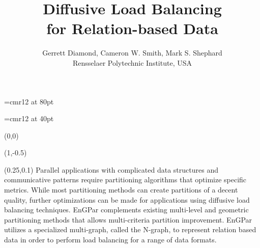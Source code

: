 \documentclass{beamer}
\begin{document}
\font\titlefont=cmr12 at 80pt
\title[]
{\titlefont
Diffusive Load Balancing \\for Relation-based Data
}
\font\authorfont=cmr12 at 40pt
\author[]{\authorfont
  Gerrett Diamond, Cameron W. Smith, Mark S. Shephard\\
  Rensselaer Polytechnic Institute, USA}
\date{}
\begin{textblock}{15.8}(0,0)
  \titlepage
  \begin{textblock}{14}(1,-0.5)
    \begin{block}{}
      \begin{textblock}{13.5}(0.25,0.1)
        \centering
        \justify
          \fontsize{37}{43}\selectfont
      Parallel applications with complicated data structures and communicative patterns
      require partitioning algorithms that optimize specific metrics. While most
      partitioning methods can create partitions of a decent quality, further
      optimizations can be made for applications using diffusive load balancing techniques.
      EnGPar complements existing multi-level and geometric partitioning methods that allows
      multi-criteria partition improvement. EnGPar utilizes a specialized multi-graph, called
      the N-graph, to represent relation based data in order to perform load balancing for a
      range of data formats.

      \end{textblock}
      \vspace{6.5cm}
    \end{block}
  \end{textblock}
\end{textblock}
\end{document}
